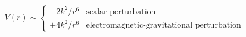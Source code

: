\begin{equation} \label{leading-potl-rn}
V(r) \sim \left\{ \begin{array}{cl}        
              -2k^2 / r^6 & \textrm{scalar perturbation} \\
              +4k^2 / r^6 & \textrm{electromagnetic-gravitational perturbation}
              \end{array} \right.
\end{equation}

